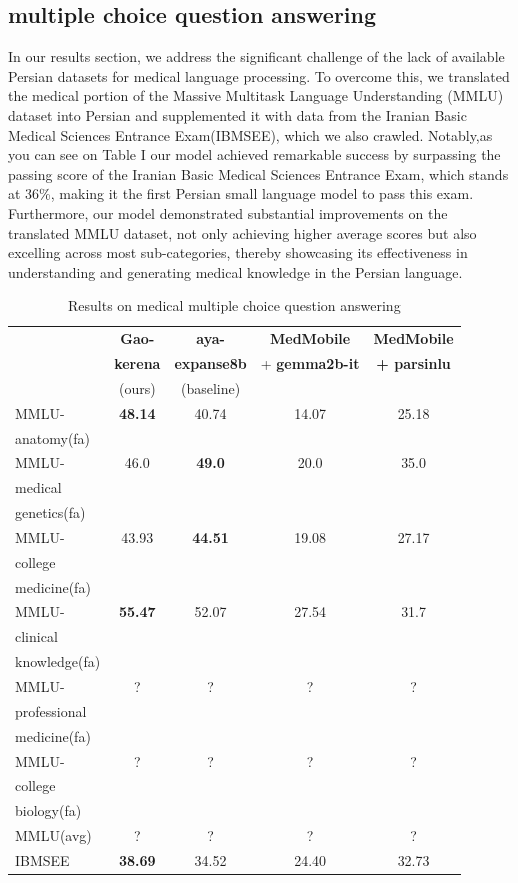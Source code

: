 \documentclass[conference]{IEEEtran}
\begin{document}
\subsection{multiple choice question answering}
In our results section, we address the significant challenge of the lack of available Persian datasets for medical language processing. To overcome this, we translated the medical portion of the Massive Multitask Language Understanding (MMLU)
\cite{b17}
dataset into Persian and supplemented it with data from the Iranian Basic Medical Sciences Entrance Exam(IBMSEE), which we also crawled. Notably,as you can see on Table I our model achieved remarkable success by surpassing the passing score of the Iranian Basic Medical Sciences Entrance Exam, which stands at 36\%, making it the first Persian small language model to pass this exam. Furthermore, our model demonstrated substantial improvements on the translated MMLU dataset, not only achieving higher average scores but also excelling across most sub-categories, thereby showcasing its effectiveness in understanding and generating medical knowledge in the Persian language.
\begin{table}[ht]
	\centering
	\caption{Results on medical multiple choice question answering}
	\begin{tabular}{|l|c|c|c|c|}  %
		\hline
		\textbf{} & \textbf{Gao-} & \textbf{aya-}
		 & \textbf{MedMobile} & \textbf{MedMobile} \\ 
		 & \textbf{kerena} & \textbf{expanse8b} & + \textbf{gemma2b-it} & \textbf{+ parsinlu} \\
		 & (ours) & (baseline) &  &  \\ \hline
		MMLU- & \textbf{48.14} & 40.74 & 14.07 & 25.18 \\ 
		anatomy(fa) &  &  &  &  \\ \hline
		MMLU- & 46.0 & \textbf{49.0} & 20.0 & 35.0 \\
		medical &  &  &  &  \\ 
		genetics(fa) &  &  &  &  \\ \hline
		MMLU- & 43.93 & \textbf{44.51} & 19.08 & 27.17 \\
		college &  &  &  &  \\
		medicine(fa) &  &  &  &  \\ \hline
		MMLU- & \textbf{55.47} & 52.07 & 27.54 & 31.7 \\
		clinical&  &  &  &  \\
		knowledge(fa)&  &  &  &  \\ \hline
		MMLU- & ? & ? & ? & ? \\
        professional&  &  &  &  \\ 
        medicine(fa)&  &  &  &  \\ \hline
        MMLU- & ? & ? & ? & ? \\
        college&  &  &  &  \\
        biology(fa)&  &  &  &  \\ \hline
        MMLU(avg) & ? & ? & ? & ? \\ \hline
		IBMSEE & \textbf{38.69} & 34.52 & 24.40 & 32.73 \\ 
        \hline
	\end{tabular}
	\label{tab:model_results}
\end{table}
\end{document}
